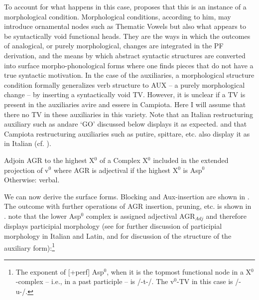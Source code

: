 \documentclass[output=paper]{langscibook}
\begin{document}
{To account for what happens in this case, \cite{calabrese2019a, calabrese2020a} proposes  that this is an instance of a morphological condition. Morphological conditions, according to him, may introduce ornamental nodes such as Thematic Vowels but also what appears to be syntactically void functional heads. They are the ways in which the outcomes of analogical, or purely morphological, changes are integrated in the PF derivation, and the means by which abstract syntactic structures are converted into surface morpho-phonological forms where one finds pieces that do not have a true syntactic motivation. In the case of the auxiliaries, a morphological structure condition formally generalizes verb structure to AUX --  a purely morphological change  --  by inserting a syntactically void TV. However, it is unclear if a TV is present in the auxiliaries avire and essere in Campiota. Here I will assume that there no TV in these auxiliaries in this variety.  Note that an Italian restructuring auxiliary such as andare ‘GO’ discussed below displays it as expected. and that Campiota restructuring auxiliaries such as putire, spittare, etc. also display it as in Italian (cf. ).}

\ea \label{ac75} Adjoin AGR to the highest X$^0$ of a Complex X$^0$ included in the extended projection of v$^0$
    \ea \label{ac75a}where AGR is adjectival if the highest X$^0$ is Asp$^0$\\
        Otherwise:
    \ex \label{ac75b}verbal.
   \z 
\z

We can now derive the surface forms. Blocking and Aux-insertion are shown in .  The outcome with further operations of AGR insertion, pruning, etc. is shown in .  note that the lower Asp$^0$ complex is assigned adjectival AGR$_{Adj}$ and therefore displays participial morphology (see \cite{calabrese2020a} for further discussion of participial morphology in Italian and Latin, and \cite{calabrese2019a} for discussion of the structure of the auxiliary form):\footnote{The exponent of [+perf] Asp$^0$, when it is the topmost functional node in a X$^0$-complex -- i.e., in a past participle --  is /-t-/.  The v$^0$-TV in this case is /-u-/.} 
\end{document}

